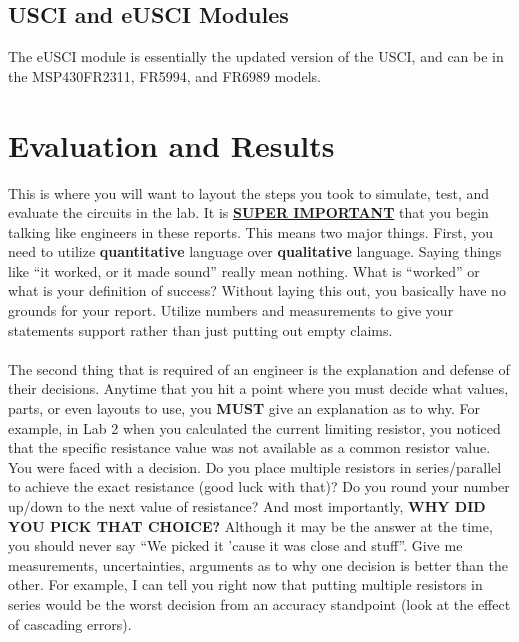 \documentclass{hitec}
\begin{document}
\subsection{USCI and eUSCI Modules}
The eUSCI module is essentially the updated version of the USCI, and can be in the MSP430FR2311, FR5994, and FR6989 models.

\section{Evaluation and Results}
This is where you will want to layout the steps you took to simulate, test, and evaluate the circuits in the lab. It is \textbf{\underline{SUPER IMPORTANT}} that you begin talking like engineers in these reports. This means two major things. First, you need to utilize \textbf{quantitative} language over \textbf{qualitative} language. Saying things like ``it worked, or it made sound'' really mean nothing. What is ``worked'' or what is your definition of success? Without laying this out, you basically have no grounds for your report. Utilize numbers and measurements to give your statements support rather than just putting out empty claims.
\\
\\
\noindent
The second thing that is required of an engineer is the explanation and defense of their decisions. Anytime that you hit a point where you must decide what values, parts, or even layouts to use, you \textbf{MUST} give an explanation as to why. For example, in Lab 2 when you calculated the current limiting resistor, you noticed that the specific resistance value was not available as a common resistor value. You were faced with a decision. Do you place multiple resistors in series/parallel to achieve the exact resistance (good luck with that)? Do you round your number up/down to the next value of resistance? And most importantly, \textbf{WHY DID YOU PICK THAT CHOICE?} Although it may be the answer at the time, you should never say ``We picked it 'cause it was close and stuff''. Give me measurements, uncertainties, arguments as to why one decision is better than the other. For example, I can tell you right now that putting multiple resistors in series would be the worst decision from an accuracy standpoint (look at the effect of cascading errors).
\end{document}
